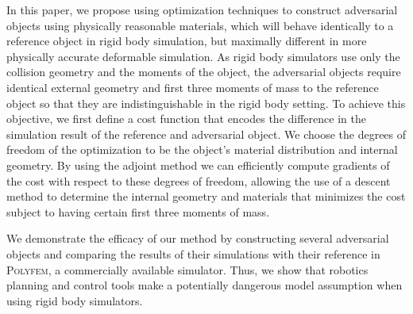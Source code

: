 In this paper, we propose using optimization techniques to construct adversarial objects using physically reasonable materials, which will behave identically to a reference object in rigid body simulation, but maximally different in more physically accurate deformable simulation. As rigid body simulators use only the collision geometry and the moments of the object, the adversarial objects require identical external geometry and first three moments of mass to the reference object so that they are indistinguishable in the rigid body setting.
To achieve this objective, we first define a cost function that encodes the difference in the simulation result of the reference and adversarial object. We choose the degrees of freedom of the optimization to be the object's material distribution and internal geometry. By using the adjoint method we can efficiently compute gradients of the cost with respect to these degrees of freedom, allowing the use of a descent method to determine the internal geometry and materials that minimizes the cost subject to having certain first three moments of mass. 

We demonstrate the efficacy of our method by constructing several adversarial objects and comparing the results of their simulations with their reference in \textsc{Polyfem}, a commercially available simulator. Thus, we show that robotics planning and control tools make a potentially dangerous model assumption when using rigid body simulators.